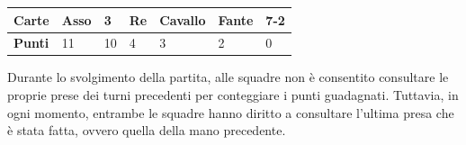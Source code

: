 \documentclass[a4paper,12pt]{article}
\begin{document}
\begin{center}
	\begin{tabular}{| l | l | l | l | l | l | l |}
		\hline
		\textbf{Carte} & Asso & 3 & Re & Cavallo & Fante & 7-2 \\ \hline
		\textbf{Punti} & 11 & 10 & 4 & 3 & 2 & 0 \\ 
		\hline
	\end{tabular}
\end{center}

Durante lo svolgimento della partita, alle squadre non è consentito consultare le proprie prese dei turni precedenti per conteggiare i punti guadagnati. Tuttavia, in ogni momento, entrambe le squadre hanno diritto a consultare l'ultima presa che è stata fatta, ovvero quella della mano precedente.
\end{document}
